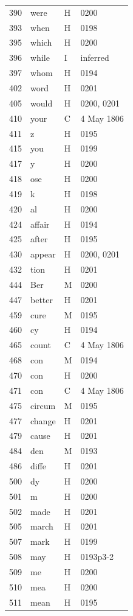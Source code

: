 \begin{longtable}{@{}rlll@{}}
390 & were & H & 0200 \\
393 & when & H & 0198 \\
395 & which & H & 0200 \\
396 & while & I & inferred \\
397 & whom & H & 0194 \\
402 & word & H & 0201 \\
405 & would & H & 0200, 0201 \\
410 & your & C & 4 May 1806 \\
411 & z & H & 0195 \\
415 & you & H & 0199 \\
417 & y & H & 0200 \\
418 & ose & H & 0200 \\
419 & k & H & 0198 \\
420 & al & H & 0200 \\
424 & affair & H & 0194 \\
425 & after & H & 0195 \\
430 & appear & H & 0200, 0201 \\
432 & tion & H & 0201 \\
444 & Ber & M & 0200 \\
447 & better & H & 0201 \\
459 & cure & M & 0195 \\
460 & cy & H & 0194 \\
465 & count & C & 4 May 1806 \\
468 & con & M & 0194 \\
470 & con & H & 0200 \\
471 & con & C & 4 May 1806 \\
475 & circum & M & 0195 \\
477 & change & H & 0201 \\
479 & cause & H & 0201 \\
484 & den & M & 0193 \\
486 & diffe & H & 0201 \\
500 & dy & H & 0200 \\
501 & m & H & 0200 \\
502 & made & H & 0201 \\
505 & march & H & 0201 \\
507 & mark & H & 0199 \\
508 & may & H & 0193p3-2 \\
509 & me & H & 0200 \\
510 & mea & H & 0200 \\
511 & mean & H & 0195 \\

\end{longtable}
